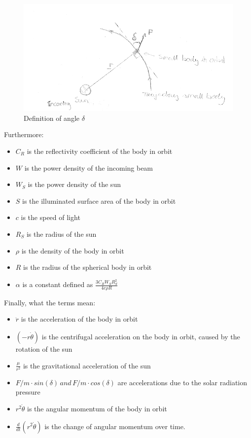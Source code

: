 \begin{figure}[H]
    \centering
    \includegraphics[width=0.4\columnwidth]{Figures/2a.png}
    \caption{Definition of angle $\delta$}
    \label{fig:delta}
\end{figure}

Furthermore:
\begin{itemize}
    \item $C_R$ is the reflectivity coefficient of the body in orbit
    \item $W$ is the power density of the incoming beam
    \item $W_S$ is the power density of the sun
    \item $S$ is the illuminated surface area of the body in orbit 
    \item $c$ is the speed of light
    \item $R_S$ is the radius of the sun
    \item $\rho$ is the density of the body in orbit
    \item $R$ is the radius of the spherical body in orbit
    \item $\alpha$ is a constant defined as $\frac{3 C_R W_S R_S^2}{4 c \rho R}$
\end{itemize}

Finally, what the terms mean:
\begin{itemize}
    \item $\ddot{r}$ is the acceleration of the body in orbit
    \item $(-r \dot{\theta})$ is the centrifugal acceleration on the body in orbit, caused by the rotation of the sun
    \item $\frac{\mu}{r^2}$ is the gravitational acceleration of the sun
    \item $F/m \cdot sin(\delta) \, and \, F/m \cdot cos(\delta)$ are accelerations due to the solar radiation pressure
    \item $r^2 \dot{\theta}$ is the angular momentum of the body in orbit
    \item $\frac{d}{dt} (r^2 \dot{\theta})$ is the change of angular momentum over time.
\end{itemize}

